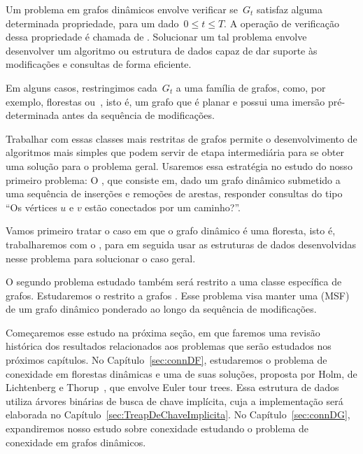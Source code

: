 Um problema em grafos dinâmicos envolve verificar se~$G_t$ satisfaz alguma determinada propriedade, para um dado~$0\leq t\leq T$.
A operação de verificação dessa propriedade é chamada de .
Solucionar um tal problema envolve desenvolver um algoritmo ou estrutura de dados capaz de dar suporte às modificações e consultas de forma eficiente.

Em alguns casos, restringimos cada~$G_t$ a uma família de grafos, como, por exemplo, florestas ou~, isto é, um grafo que é planar e possui uma imersão pré-determinada antes da sequência de modificações.

Trabalhar com essas classes mais restritas de grafos permite o desenvolvimento de algoritmos mais simples que podem servir de etapa intermediária para se obter uma solução para o problema geral.
Usaremos essa estratégia no estudo do nosso primeiro problema:
O , que consiste em, dado um grafo dinâmico submetido a uma sequência de inserções e remoções de arestas, responder consultas do tipo “Os vértices $u$ e $v$ estão conectados por um caminho?”.

Vamos primeiro tratar o caso em que o grafo dinâmico é uma floresta, isto é, trabalharemos com o ,
para em seguida usar as estruturas de dados desenvolvidas nesse problema para solucionar o caso geral.

O segundo problema estudado também será restrito a uma classe específica de grafos.
Estudaremos o  restrito a grafos .
Esse problema visa manter uma  (MSF) de um grafo dinâmico ponderado ao longo da sequência de modificações.

Começaremos esse estudo na próxima seção, em que faremos uma revisão histórica dos resultados relacionados aos problemas que serão estudados nos próximos capítulos.
No Capítulo~\ref{sec:connDF}, estudaremos o problema de conexidade em florestas dinâmicas e uma de suas soluções, proposta por Holm, de Lichtenberg e Thorup~\cite{poly_log}, que envolve Euler tour trees.
Essa estrutura de dados utiliza árvores binárias de busca de chave implícita, cuja a implementação será elaborada no Capítulo~\ref{sec:TreapDeChaveImplicita}.
No Capítulo~\ref{sec:connDG}, expandiremos nosso estudo sobre conexidade estudando o problema de conexidade em grafos dinâmicos.

